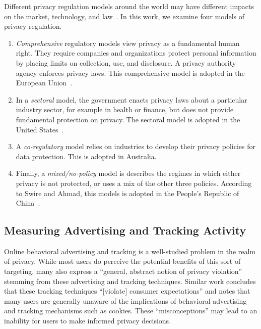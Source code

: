 \documentclass[conference]{IEEEtran}
\begin{document}
Different privacy regulation models around the world may have different impacts on the market, technology, and law~\cite{IAPPbook}. In this work, we examine four models of privacy regulation. 
\begin{enumerate}
	\item \emph{Comprehensive} regulatory models view privacy as a fundamental human right.  They require companies and organizations protect personal information by placing limits on collection, use, and disclosure. A privacy authority agency enforces privacy laws.  This comprehensive model is adopted in the European Union~\cite{IAPPbook}.  
	\item In a \emph{sectoral} model, the government enacts privacy laws about a particular industry sector, for example in health or finance, but does not provide fundamental protection on privacy.  The sectoral model is adopted in the United States~\cite{solove2006model}. 
	\item A \emph{co-regulatory} model relies on industries to develop their privacy policies for data protection.  This is adopted in Australia. 
	\item Finally, a \emph{mixed/no-policy} model is describes the regimes in which either privacy is not protected, or uses a mix of the other three policies.  According to Swire and Ahmad, this models is adopted in the People's Republic of China~\cite{IAPPbook}. 
\end{enumerate}

\subsection{Measuring Advertising and Tracking Activity}
Online behavioral advertising and tracking is a well-studied problem in the realm of privacy. While most users do perceive the potential benefits of this sort of targeting, many also express a ``general, abstract notion of privacy violation'' stemming from these advertising and tracking techniques\cite{ur2012}. Similar work concludes that these tracking techniques ``[violate] consumer expectations'' and notes that many users are generally unaware of the implications of behavioral advertising and tracking mechanisms such as cookies. These ``misconceptions'' may lead to an inability for users to make informed privacy decisions\cite{mcdonald2010}.
\end{document}
